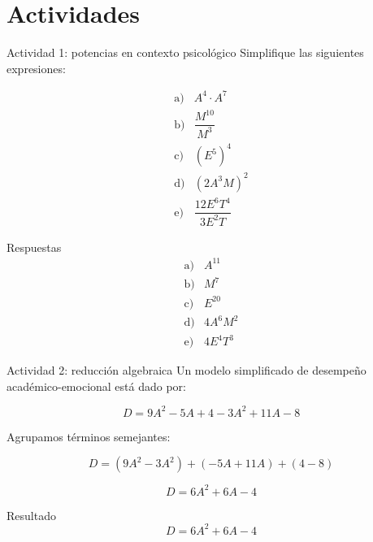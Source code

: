 \documentclass[handout,aspectratio=169]{beamer}
\begin{document}
	\section{Actividades}
	
	\begin{frame}{Actividad 1: potencias en contexto psicológico}
		Simplifique las siguientes expresiones:
		
		\[
		\begin{array}{ll}
			\text{a)} & A^4\cdot A^7 \\[0.2cm]
			\text{b)} & \dfrac{M^{10}}{M^3} \\[0.3cm]
			\text{c)} & (E^5)^4 \\[0.2cm]
			\text{d)} & (2A^3M)^2 \\[0.2cm]
			\text{e)} & \dfrac{12E^6T^4}{3E^2T}
		\end{array}
		\]
		
		\pause
		
		\begin{block}{Respuestas}
			\[
			\begin{array}{ll}
				\text{a)} & A^{11} \\[0.2cm]
				\text{b)} & M^7 \\[0.2cm]
				\text{c)} & E^{20} \\[0.2cm]
				\text{d)} & 4A^6M^2 \\[0.2cm]
				\text{e)} & 4E^4T^3
			\end{array}
			\]
		\end{block}
	\end{frame}
	
	
	\begin{frame}{Actividad 2: reducción algebraica}
		Un modelo simplificado de desempeño académico-emocional está dado por:
		
		\[
		D=9A^2-5A+4-3A^2+11A-8
		\]
		
		\pause
		
		Agrupamos términos semejantes:
		
		\[
		D=(9A^2-3A^2)+(-5A+11A)+(4-8)
		\]
		
		\pause
		
		\[
		D=6A^2+6A-4
		\]
		
		\pause
		
		\begin{block}{Resultado}
			\[
			D=6A^2+6A-4
			\]
		\end{block}
	\end{frame}
	
\end{document}
